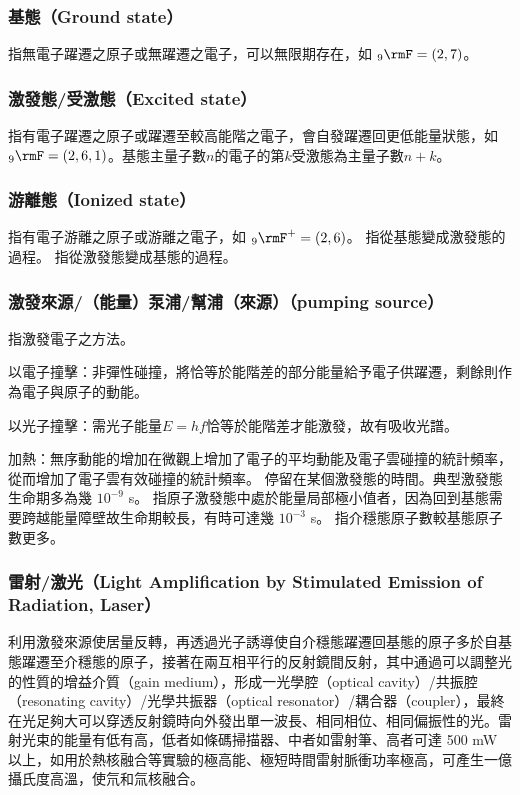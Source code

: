 \documentclass[a4paper,12pt]{report}
\begin{document}
\subsubsection{基態（Ground state）}
指無電子躍遷之原子或無躍遷之電子，可以無限期存在，如 $_9\rmF = (2, 7)$。
\subsubsection{激發態/受激態（Excited state）}
指有電子躍遷之原子或躍遷至較高能階之電子，會自發躍遷回更低能量狀態，如 $_9\rmF = (2, 6, 1)$。基態主量子數$n$的電子的第$k$受激態為主量子數$n+k$。
\subsubsection{游離態（Ionized state）}
指有電子游離之原子或游離之電子，如 $_9\rmF^+ = (2, 6)$。
指從基態變成激發態的過程。
指從激發態變成基態的過程。
\subsubsection{激發來源/（能量）泵浦/幫浦（來源）（pumping source）}
指激發電子之方法。
\bit
\item 以電子撞擊：非彈性碰撞，將恰等於能階差的部分能量給予電子供躍遷，剩餘則作為電子與原子的動能。
\item 以光子撞擊：需光子能量$E = hf$恰等於能階差才能激發，故有吸收光譜。
\item 加熱：無序動能的增加在微觀上增加了電子的平均動能及電子雲碰撞的統計頻率，從而增加了電子雲有效碰撞的統計頻率。
\eit
{}
停留在某個激發態的時間。典型激發態生命期多為幾 $10^{-9}$ s。
指原子激發態中處於能量局部極小值者，因為回到基態需要跨越能量障壁故生命期較長，有時可達幾 $10^{-3}$ s。
指介穩態原子數較基態原子數更多。
\subsubsection{雷射/激光（Light Amplification by Stimulated Emission of Radiation, Laser）}
利用激發來源使居量反轉，再透過光子誘導使自介穩態躍遷回基態的原子多於自基態躍遷至介穩態的原子，接著在兩互相平行的反射鏡間反射，其中通過可以調整光的性質的增益介質（gain medium），形成一光學腔（optical cavity）/共振腔（resonating cavity）/光學共振器（optical resonator）/耦合器（coupler），最終在光足夠大可以穿透反射鏡時向外發出單一波長、相同相位、相同偏振性的光。雷射光束的能量有低有高，低者如條碼掃描器、中者如雷射筆、高者可達 500 mW 以上，如用於熱核融合等實驗的極高能、極短時間雷射脈衝功率極高，可產生一億攝氏度高溫，使氘和氚核融合。
\end{document}
